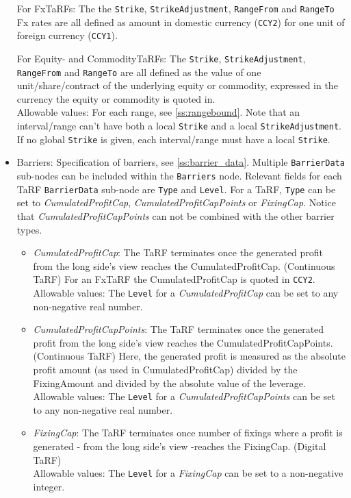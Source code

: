 \begin{itemize}
    For FxTaRFs: The the  \lstinline!Strike!, \lstinline!StrikeAdjustment!, \lstinline!RangeFrom! and \lstinline!RangeTo! Fx rates are all defined as amount in domestic
currency (\lstinline!CCY2!) for one unit of foreign currency (\lstinline!CCY1!).
    
For Equity- and CommodityTaRFs: The \lstinline!Strike!, \lstinline!StrikeAdjustment!, \lstinline!RangeFrom! and \lstinline!RangeTo!  are all defined as the value of one
unit/share/contract of the underlying equity or commodity, expressed in the currency the equity or commodity is quoted in. \\
    
Allowable values: For each range, see \ref{ss:rangebound}. Note that an interval/range can't have both a local \lstinline!Strike!  and a local \lstinline!StrikeAdjustment!. If no global \lstinline!Strike! is given, each interval/range must have a local \lstinline!Strike!.

    \item Barriers: Specification of barriers, see \ref{ss:barrier_data}. Multiple \lstinline!BarrierData! sub-nodes can be included within the \lstinline!Barriers! node. Relevant fields for each TaRF \lstinline!BarrierData! sub-node are \lstinline!Type! and \lstinline!Level!.  For a TaRF, \lstinline!Type! can be set to \emph{CumulatedProfitCap}, \emph{CumulatedProfitCapPoints} or \emph{FixingCap}. Notice that \emph{CumulatedProfitCapPoints} can not be combined with the other barrier types.
    
    \begin{itemize}
    \item \emph{CumulatedProfitCap}: The TaRF terminates once the generated profit from the long side's view reaches the
      CumulatedProfitCap. (Continuous TaRF) For an FxTaRF the CumulatedProfitCap is quoted in
      \lstinline!CCY2!. \\ Allowable values: The \lstinline!Level! for a \emph{CumulatedProfitCap} can be set to any
      non-negative real number.

    \item \emph{CumulatedProfitCapPoints}: The TaRF terminates once the generated profit from the long side's view
      reaches the CumulatedProfitCapPoints. (Continuous TaRF) Here, the generated profit is measured as the absolute
      profit amount (as used in CumulatedProfitCap) divided by the FixingAmount and divided by the absolute value of the
      leverage. \\ Allowable values: The \lstinline!Level! for a \emph{CumulatedProfitCapPoints} can be set to any
      non-negative real number.

    \item \emph{FixingCap}: The TaRF terminates once number of fixings where a profit is generated - from the long side's view -reaches the FixingCap. (Digital TaRF)\\
     Allowable values: The \lstinline!Level! for a \emph{FixingCap} can be set to a non-negative integer.
    \end{itemize}

\end{itemize}

